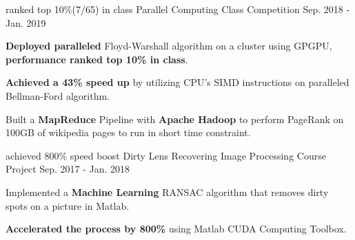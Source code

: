 \begin{cventries}
\cventry
{ranked top 10\%(7/65) in class} %
{Parallel Computing} %
{Class Competition} %
{Sep. 2018 - Jan. 2019} %
{ %
\begin{cvitems}
  \item \textbf{Deployed paralleled} Floyd-Warshall algorithm on a cluster using GPGPU, \textbf{performance ranked top 10\% in class}.
  \item \textbf{Achieved a 43\% speed up} by utilizing CPU's SIMD instructions on paralleled Bellman-Ford algorithm.
  \item Built a \textbf{MapReduce} Pipeline with \textbf{Apache Hadoop} to perform PageRank on 100GB of wikipedia pages to run in short time constraint. 
\end{cvitems}
}

\cventry
{achieved 800\% speed boost} %
{Dirty Lens Recovering} %
{Image Processing Course Project} %
{Sep. 2017 - Jan. 2018} %
{ %
\begin{cvitems}
  \item Implemented a \textbf{Machine Learning} RANSAC algorithm that removes dirty spots on a picture in Matlab.
  \item \textbf{Accelerated the process by 800\%} using Matlab CUDA Computing Toolbox.
\end{cvitems}
}

\end{cventries}